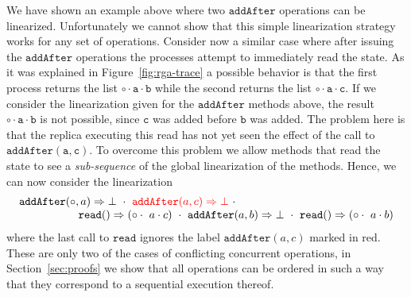 We have shown an example above where two $\mathtt{addAfter}$
operations can be linearized.
%
Unfortunately we cannot show that this simple linearization strategy
works for any set of operations.
%
Consider now a similar case where after issuing the
$\mathtt{addAfter}$ operations the processes attempt to immediately
read the state.
%
As it was explained in Figure~\ref{fig:rga-trace} a possible behavior is
that the first process returns the list $\mathtt{\circ \cdot a \cdot
  b}$ while the second returns the list $\mathtt{\circ \cdot a \cdot
  c}$. 
%
If we consider the linearization given for the $\mathtt{addAfter}$
methods above, the result $\mathtt{\circ \cdot a \cdot b}$ is not
possible, since $\mathtt{c}$ was added before $\mathtt{b}$ was added.
%
The problem here is that the replica executing this read has not yet
seen the effect of the call to $\mathtt{addAfter(a, c)}$.
%
To overcome this problem we allow methods that read the state to see a
\emph{sub-sequence} of the global linearization of the methods.
%
Hence, we can now consider the linearization 
\[
  \begin{array}{c}
    \alabellong[\mathtt{addAfter}]{\circ,a}{\bot}\ \cdot\
    {\color{red} \alabellong[\mathtt{addAfter}]{a,c}{\bot}}\ \cdot \kern5cm\\    
    \hspace{\fill} \alabellong[\mathtt{read}]{}{(\circ \cdot\ a \cdot c)}\ \cdot\
    \alabellong[\mathtt{addAfter}]{a,b}{\bot}\ \cdot\
    \alabellong[\mathtt{read}]{}{(\circ \cdot\ a \cdot b)}
  \end{array}
\]
where the last call to $\mathtt{read}$ ignores the label
{\color{red} $\mathtt{addAfter}(a, c)$} marked in red.
%
These are only two of the cases of conflicting concurrent
operations, in Section~\ref{sec:proofs} we show that all operations
can be ordered in such a way that they correspond to a sequential
execution thereof.


